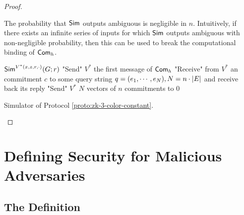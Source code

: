 \begin{proof}
\begin{claim} The probability that ${\sf Sim}$ outputs {\sf ambiguous} is negligible in $n$.
Intuitively, if there exists an infinite series of inputs for which ${\sf Sim}$ outputs {\sf ambiguous} with non-negligible probability, then this can be used to break the computational binding of ${\sf Com}_h$.
\end{claim}

\begin{algorithm}
${\sf Sim}^{V^*(x,z,r,\cdot)}(G;r)$\;
"Send" $V^*$ the first message of ${\sf Com}_h$\;
"Receive" from $V^*$ an commitment $c$ to some query string $q=(e_1,\cdots,e_N),N=n\cdot\left|E\right|$ and receive back its reply\;
"Send" $V^*$ $N$ vectors of $n$ commitments to $0$\;

\caption{Simulator of Protocol \ref{proto:zk-3-color-constant}.} \label{alg:zk-3-color-constant-sim}
\end{algorithm}

\end{proof}

\section{Defining Security for Malicious Adversaries}
\subsection{The Definition}



\nocite{*} 
